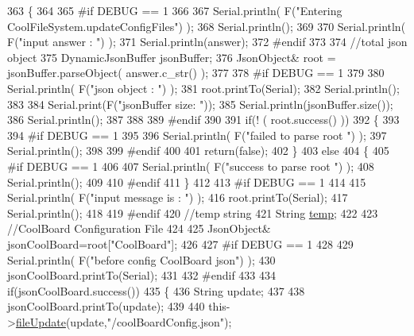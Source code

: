 \begin{DoxyCode}
363 \{
364 
365 \textcolor{preprocessor}{#if DEBUG == 1}
366 
367     Serial.println( F(\textcolor{stringliteral}{"Entering CoolFileSystem.updateConfigFiles"}) );
368     Serial.println();
369     
370     Serial.println( F(\textcolor{stringliteral}{"input answer : "}) );
371     Serial.println(answer);
372 \textcolor{preprocessor}{#endif}
373 
374     \textcolor{comment}{//total json object }
375     DynamicJsonBuffer jsonBuffer;
376     JsonObject& root = jsonBuffer.parseObject( answer.c\_str() );
377 
378 \textcolor{preprocessor}{#if DEBUG == 1}
379     
380     Serial.println( F(\textcolor{stringliteral}{"json object : "}) );  
381     root.printTo(Serial);
382     Serial.println();
383     
384     Serial.print(F(\textcolor{stringliteral}{"jsonBuffer size: "}));
385     Serial.println(jsonBuffer.size());
386     Serial.println();
387 
388 
389 \textcolor{preprocessor}{#endif}
390 
391     \textcolor{keywordflow}{if}(! ( root.success() ))
392     \{
393     
394 \textcolor{preprocessor}{    #if DEBUG == 1}
395 
396         Serial.println( F(\textcolor{stringliteral}{"failed to parse root "}) );
397         Serial.println();
398     
399 \textcolor{preprocessor}{    #endif}
400 
401         \textcolor{keywordflow}{return}(\textcolor{keyword}{false});
402     \}
403     \textcolor{keywordflow}{else}
404     \{
405 \textcolor{preprocessor}{    #if DEBUG == 1}
406         
407         Serial.println( F(\textcolor{stringliteral}{"success to parse root "}) );
408         Serial.println();
409         
410 \textcolor{preprocessor}{    #endif  }
411     \}
412     
413 \textcolor{preprocessor}{#if DEBUG == 1}
414 
415     Serial.println( F(\textcolor{stringliteral}{"input message is : "}) );
416     root.printTo(Serial);
417     Serial.println();
418 
419 \textcolor{preprocessor}{#endif}
420     \textcolor{comment}{//temp string}
421     String \hyperlink{Irene3000_8h_a5905d48604152cf57aa6bfa087b49173}{temp};
422 
423     \textcolor{comment}{//CoolBoard Configuration File}
424 
425         JsonObject& jsonCoolBoard=root[\textcolor{stringliteral}{"CoolBoard"}];
426 
427 \textcolor{preprocessor}{#if DEBUG == 1}
428 
429     Serial.println( F(\textcolor{stringliteral}{"before config CoolBoard json"}) );
430     jsonCoolBoard.printTo(Serial);
431 
432 \textcolor{preprocessor}{#endif}
433 
434     \textcolor{keywordflow}{if}(jsonCoolBoard.success())
435     \{
436         String update;
437     
438         jsonCoolBoard.printTo(update);
439 
440         this->\hyperlink{classCoolFileSystem_a13f2958f5b87757c31fc53797a30d23a}{fileUpdate}(update,\textcolor{stringliteral}{"/coolBoardConfig.json"});     

\end{DoxyCode}
